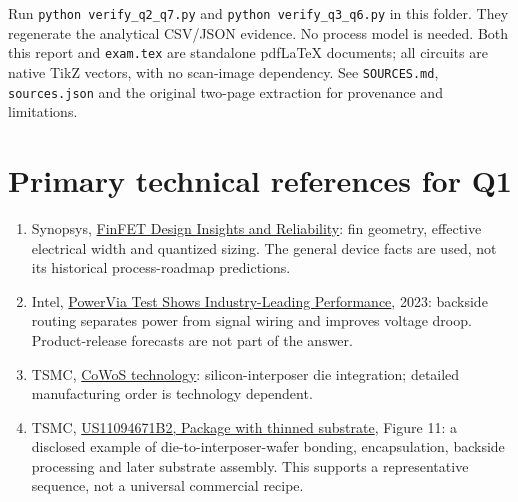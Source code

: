 \documentclass[10pt]{article}
\begin{document}
Run \texttt{python verify\_q2\_q7.py} and \texttt{python verify\_q3\_q6.py} in this folder. They regenerate the analytical CSV/JSON evidence. No process model is needed. Both this report and \texttt{exam.tex} are standalone pdfLaTeX documents; all circuits are native TikZ vectors, with no scan-image dependency. See \texttt{SOURCES.md}, \texttt{sources.json} and the original two-page extraction for provenance and limitations.

\section*{Primary technical references for Q1}
\begin{enumerate}[leftmargin=7mm,itemsep=5pt]
\item Synopsys, \href{https://www.synopsys.com/articles/finfet-design.html}{FinFET Design Insights and Reliability}: fin geometry, effective electrical width and quantized sizing. The general device facts are used, not its historical process-roadmap predictions.
\item Intel, \href{https://www.intel.com/content/www/us/en/newsroom/news/powervia-test-shows-industry-leading-performance.html}{PowerVia Test Shows Industry-Leading Performance}, 2023: backside routing separates power from signal wiring and improves voltage droop. Product-release forecasts are not part of the answer.
\item TSMC, \href{https://www.tsmc.com/english/dedicatedFoundry/technology/cowos}{CoWoS technology}: silicon-interposer die integration; detailed manufacturing order is technology dependent.
\item TSMC, \href{https://patents.google.com/patent/US11094671B2/en}{US11094671B2, Package with thinned substrate}, Figure 11: a disclosed example of die-to-interposer-wafer bonding, encapsulation, backside processing and later substrate assembly. This supports a representative sequence, not a universal commercial recipe.
\end{enumerate}
\end{document}
